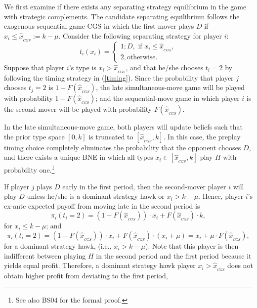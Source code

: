 \documentclass[12pt, letterpaper]{article}
\theoremstyle{plain}
\begin{document}
We first examine if there exists any separating strategy equilibrium in the game with strategic complements. The candidate separating equilibrium follows the exogenous sequential game CGS in which the first mover plays $D$ if $x_i\leq \hat{x}_{_{CGS}}:= k-\mu$. Consider the following separating strategy for player $i $:
\begin{equation}
 t_i(x_i)=
 \begin{cases} 1; D, \mbox{ if } x_i  \leq \hat{x}_{_{CGS}}, \\
 2,  \text{otherwise}.
 \end{cases}
 \label{timing}
\end{equation}
Suppose that player $i$'s type is $x_i >\hat{x}_{_{CGS}}$, and that he/she chooses $t_i=2$ by following the timing strategy  in (\ref{timing}).  Since the probability that player $j$ chooses $t_j=2$ is $1-F(\hat{x}_{_{CGS}})$, the late simultaneous-move game will be played with probability $1-F(\hat{x}_{_{CGS}})$; and the sequential-move game in which player $i$ is the second mover will be played with probability $F(\hat{x}_{_{CGS}})$.

In the late simultaneous-move game, both players will update beliefs such that the prior type space $[0, k]$ is truncated to $[\hat{x}_{_{CGS}},k]$. In this case, the preplay timing choice completely eliminates the probability that the opponent chooses $D$, and there exists a unique BNE in which all types $x_i \in [\hat{x}_{_{CGS}},k]$ play $H$ with probability one.\footnote{See also BS04 for the formal proof.} 
 
If player $j$ plays $D$ early in the first period, then the second-mover player $i$ will play $D$ unless he/she is a dominant strategy hawk or $x_i>k-\mu$. Hence, player $i$'s ex-ante expected payoff from moving late in the second period is
\begin{equation}
\pi_i(t_i=2)=(1-F(\hat{x}_{_{CGS}}))\cdot x_i+F(\hat{x}_{_{CGS}}) \cdot k,
\end{equation}
for $x_i\leq k-\mu$; and
\begin{equation}
\pi_i(t_i=2)=(1-F(\hat{x}_{_{CGS}}))\cdot x_i+F(\hat{x}_{_{CGS}}) \cdot (x_i+\mu)=x_i + \mu\cdot  F(\hat{x}_{_{CGS}}),
\end{equation}for a dominant strategy hawk, (i.e., $x_i> k-\mu$). Note that this player is then indifferent between playing $H$ in the second period and the first period because it yields equal profit. Therefore, a dominant strategy hawk player $x_i>\hat{x}_{_{CGS}}$ does not obtain higher profit from deviating to the first period, 
\end{document}
